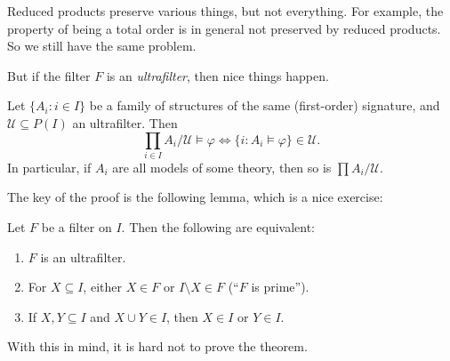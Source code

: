 \documentclass[a4paper]{article}
\begin{document}
%
%
%
%

Reduced products preserve various things, but not everything. For example, the property of being a total order is in general not preserved by reduced products. So we still have the same problem.

But if the filter $F$ is an \emph{ultrafilter}, then nice things happen.

\begin{thm}[\L{}o\'s theorem]
  Let $\{A_i: i \in I\}$ be a family of structures of the same (first-order) signature, and $\mathcal{U} \subseteq P(I)$ an ultrafilter. Then
  \[
    \prod_{i \in I} A_i/\mathcal{U} \vDash \varphi \Longleftrightarrow \{i: A_i \vDash \varphi\} \in \mathcal{U}.
  \]
  In particular, if $A_i$ are all models of some theory, then so is $\prod A_i / \mathcal{U}$.
\end{thm}

The key of the proof is the following lemma, which is a nice exercise:
\begin{lemma}
  Let $F$ be a filter on $I$. Then the following are equivalent:
  \begin{enumerate}
    \item $F$ is an ultrafilter.
    \item For $X \subseteq I$, either $X \in F$ or $I\setminus X \in F$ (``$F$ is prime'').
    \item If $X, Y \subseteq I$ and $X \cup Y \in I$, then $X \in I$ or $Y \in I$.
  \end{enumerate}
\end{lemma}
With this in mind, it is hard not to prove the theorem.
\end{document}
